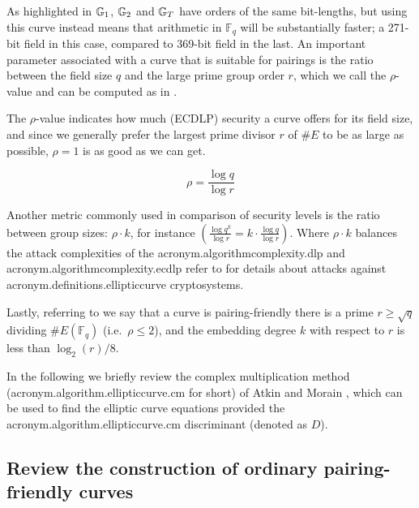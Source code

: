 As highlighted in  $\mathbb{G}_1$, $\mathbb{G}_2$ and $\mathbb{G}_T$ have orders of the same bit-lengths, but using this curve instead means that arithmetic in $\mathbb{F}_q$ will be substantially faster; a 271-bit field in this case, compared to 369-bit field in the last. An important parameter associated with a curve that is suitable for pairings is the ratio between the field size $q$ and the large prime group order $r$, which we call the $\rho$-value and can be computed as in .

The $\rho$-value indicates how much (ECDLP) security a curve offers for its field size, and since we generally prefer the largest prime divisor $r$ of $\#E$ to be as large as possible, $\rho = 1$ is as good as we can get.

\begin{equation}
	\rho = \frac{\log q}{\log r}
	\label{eq:rhocomputed}
\end{equation}

Another metric commonly used in comparison of security levels is the ratio between group sizes: $\rho \cdot k$, for instance $\left(\frac{\log q^k}{\log r} = k \cdot \frac{\log q}{\log r}\right)$. Where $\rho \cdot k$  balances the attack complexities of the \acs{acronym.algorithmcomplexity.dlp} and \acs{acronym.algorithmcomplexity.ecdlp}  refer to \cite{theory.pairings.for.beginners,FanVerbauwhede2012} for details about attacks against \acs{acronym.definitions.ellipticcurve} cryptosystems.

Lastly, referring to \cite{taxonomyofpbc} we say that a curve is pairing-friendly there is a prime $r \geq \sqrt{q}$ dividing $\#E(\mathbb{F}_q)$ (i.e.\ $\rho \leq 2$), and the embedding degree $k$ with respect to $r$ is less than $\log_2(r)/8$.
 
In the following  we briefly review the complex multiplication method (\acs{acronym.algorithm.ellipticcurve.cm} for short) of Atkin and Morain \cite{AM93}, which can be used to find the elliptic curve equations provided the \acs{acronym.algorithm.ellipticcurve.cm} discriminant (denoted as $D$).


 
\subsection{Review the construction of ordinary pairing-friendly curves}
\label{ssec:constructionofpairingfirendly}



